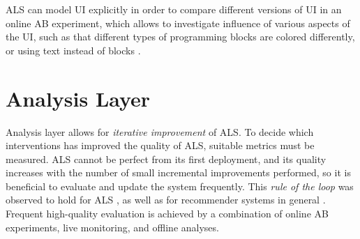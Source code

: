 ALS can model UI explicitly in order to compare different versions
of UI in an online AB experiment,
which allows to investigate influence of various aspects of
the UI, such as that different types of programming blocks are colored differently,
or using text instead of blocks %
\cite{comparing-blocks-text-weintrop2017}.


\section{Analysis Layer}
\label{sec:metrics-and-evaluation}



Analysis layer allows for \emph{iterative improvement} of ALS.
To decide which interventions has improved the quality of ALS,
  suitable metrics must be measured. %
ALS cannot be perfect from its first deployment,
and its quality increases with the number of small
incremental improvements performed, so it is beneficial to
evaluate and update the system frequently.
This \emph{rule of the loop} \cite{book-of-lenses}
was observed to hold for ALS \cite[p.124]{its-domain-models, stupid-tutoring-systems-intelligent-humans}, %
as well as for recommender systems in general \cite[][Rule 16]{google-ml-rules}.
Frequent high-quality evaluation is achieved by a combination of
  online AB experiments, live monitoring, and offline analyses.

